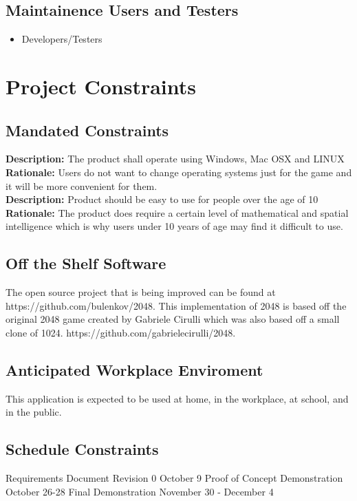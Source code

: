 \subsection{Maintainence Users and Testers}
\begin{itemize}
\item Developers/Testers
\end{itemize}

\section{Project Constraints}
\subsection{Mandated Constraints}
\textbf{Description:} The product shall operate using Windows, Mac OSX and 
LINUX\\
\textbf{Rationale:} Users do not want to change operating systems just for the 
game and it will be more convenient for them.\\
\textbf{Description:} Product should be easy to use for people over the age 
of 10\\
\textbf{Rationale:} The product does require a certain level of mathematical 
and spatial intelligence which is why users under 10 years of age may find it 
difficult to use. 
\subsection{Off the Shelf Software}
\par\indent\indent The open source project that is being improved can be found
at \\ https://github.com/bulenkov/2048.
This implementation of 2048 is based off the original 2048 game created by 
Gabriele Cirulli which was also based off a small clone of 1024. 
https://github.com/gabrielecirulli/2048.
\subsection{Anticipated Workplace Enviroment}
This application is expected to be used at home, in the workplace, at school, and in the public.\newline
\subsection{Schedule Constraints}
Requirements Document Revision 0	\hfill	October 9 \newline
Proof of Concept Demonstration \hfill		October 26-28 \newline
Final Demonstration \hfill				November 30 - December 4 \newline


